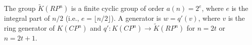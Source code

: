 The group $\tilde{K}(RP^n)$ is a finite cyclic group of order $a(n) = 2^e$, where $e$ is the integral part of $n/2$ (i.e., $e = \lfloor n/2 \rfloor$). A generator is $w = q'(v)$, where $v$ is the ring generator of $K(CP^n)$ and $q': K(CP^n) \to \tilde{K}(RP^n)$ for $n = 2t$ or $n = 2t + 1$.
